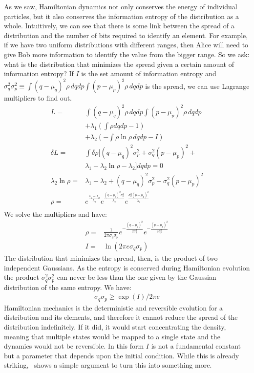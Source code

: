\documentclass[11pt]{elsarticle}
\begin{document}
As we saw, Hamiltonian dynamics not only conserves the energy of individual particles, but it also conserves the information entropy of the distribution as a whole. Intuitively, we can see that there is some link between the spread of a distribution and the number of bits required to identify an element. For example, if we have two uniform distributions with different ranges, then Alice will need to give Bob more information to identify the value from the bigger range. So we ask: what is the distribution that minimizes the spread given a certain amount of information entropy? If $I$ is the set amount of information entropy and $\sigma_q^2 \sigma_p^2 \equiv \int (q-\mu_q)^2 \rho \, dqdp \int (p-\mu_p)^2 \rho \, dqdp$ is the spread, we can use Lagrange multipliers to find out.
\begin{align*}
L = &\int (q-\mu_q)^2 \rho \, dqdp \int (p-\mu_p)^2 \rho \, dqdp \\
&+ \lambda_1(\int \rho dqdp - 1) \\ &+ \lambda_2(- \int \rho \ln \rho \, dqdp - I)\\ 
\delta L = &\int \delta \rho [(q-\mu_q)^2 \sigma_p^2 + \sigma_q^2 (p-\mu_p)^2 + \\ &\lambda_1 - \lambda_2 \ln \rho - \lambda_2 ] dqdp = 0 \\
\lambda_2 \ln \rho = &\lambda_1 - \lambda_2 + (q-\mu_q)^2 \sigma_p^2 + \sigma_q^2 (p-\mu_p)^2 \\
\rho = &e^{\frac{\lambda_1 - \lambda_2}{\lambda_2}}e^{\frac{(q-\mu_q)^2 \sigma_p^2}{\lambda_2}}e^{\frac{\sigma_q^2 (p-\mu_p)^2}{\lambda_2}}\\
\end{align*}
We solve the multipliers and have:
\begin{align*}
\rho = &\frac{1}{ 2 \pi \sigma_q \sigma_p} e^{-\frac{(q-\mu_q)^2}{2\sigma_q^2}} e^{-\frac{(p-\mu_p)^2}{2\sigma_p^2}} \\
I = &\ln (2\pi e\sigma_q\sigma_p)
\end{align*}
The distribution that minimizes the spread, then, is the product of two independent Gaussians. As the entropy is conserved during Hamiltonian evolution the product $\sigma_q^2 \sigma_p^2$ can never be less than the one given by the Gaussian distribution of the same entropy. We have:
\begin{align*}
\sigma_q\sigma_p \geq \exp (I) / 2 \pi e 
\end{align*}
Hamiltonian mechanics is the deterministic and reversible evolution for a distribution and its elements, and therefore it cannot reduce the spread of the distribution indefinitely. If it did, it would start concentrating the density, meaning that multiple states would be mapped to a single state and the dynamics would not be reversible. In this form $I$ is not a fundamental constant but a parameter that depends upon the initial condition. While this is already striking,~\cite{AoPPhy1} shows a simple argument to turn this into something more.
\end{document}
